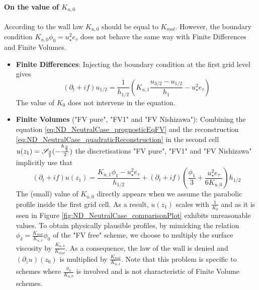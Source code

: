 \paragraph{On the value of $K_{u,0}$}
\label{sec:ND_StratifiedCase_viscosity0_FVpure}
According to the wall law $K_{u,0}$ should be equal to $K_{mol}$.
However, the boundary condition $K_{u,0} \phi_0 = u_\star^2 e_\tau$
does not behave the same way with Finite Differences and Finite
Volumes.
\begin{itemize}
	\item \textbf{Finite Differences}:
Injecting the boundary condition at the first grid level gives
		\begin{equation}
			(\partial_t+if) u_{1/2} = \frac{1}{h_{1/2}}
			\left(K_{u,1}\frac{u_{3/2} - u_{1/2}}{h_1}
			 - u_\star^2 e_\tau \right)
		\end{equation}
The value of $K_0$ does not intervene in the equation.
\item \textbf{Finite Volumes} ("FV pure", "FV1" and "FV Nishizawa"):
Combining the equation \eqref{eq:ND_NeutralCase_prognosticEqFV}
and the reconstruction
\eqref{eq:ND_NeutralCase_quadraticReconstruction} in the second cell
$u(z_1) = {\cal S}_{\frac{3}{2}}(-\frac{h_\frac{3}{2}}{2})$
the discretisations "FV pure", "FV1" and "FV Nishizawa"
implicitly use that
\begin{equation}
		(\partial_t+if) u(z_1) =
		\frac{K_{u,1} \phi_1 - u_\star^2 e_\tau} {h_{1/2}}
		+ (\partial_t+if)\left(\frac{\phi_1}{3}
		+ \frac{u_\star^2 e_\tau}{6 K_{u,0}}\right)h_{1/2}
\end{equation}
The (small) value of $K_{u,0}$ directly appears when we assume the
parabolic profile inside the first grid cell.
As a result, $u(z_1)$ scales with $\frac{1}{K_0}$ and
as it is seen in Figure \ref{fig:ND_NeutralCase_comparisonPlot}
exhibits unreasonable values.
To obtain physically plausible profiles,
by mimicking the relation
$\phi_{\delta} = \frac{K_{mol}}{K_{u,\delta}}\phi_0$ of the
"FV free" scheme, we choose to multiply the surface
viscosity by $\frac{K_{u,\delta}}{K_{mol}}$.
As a consequence, the law of the wall is denied and
$(\partial_z u)(z_0)$ is multiplied
by $\frac{K_{mol}}{K_{u,\delta}}$.
Note that this problem is specific to schemes where
$\frac{\phi_0}{K_{u,0}}$ is involved and
is not characteristic of Finite Volume schemes.
\end{itemize}

